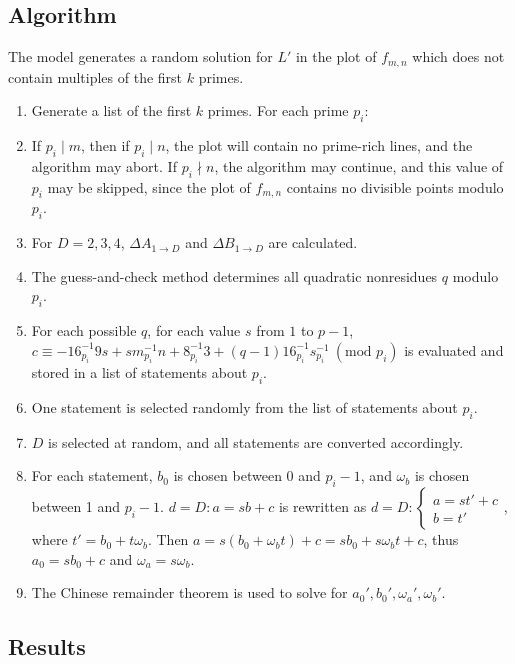 \documentclass{article}
\begin{document}
\subsection{Algorithm}

The model generates a random solution for \(L'\) in the plot of \(f_{m,n}\) which does not contain multiples of the first \(k\) primes.

\begin{enumerate}
	\item Generate a list of the first \(k\) primes. For each prime \(p_i\):
	\item If \(p_i \mid m\), then if \(p_i \mid n\), the plot will contain no prime-rich lines, and the algorithm may abort. If \(p_i \nmid n\), the algorithm may continue, and this value of \(p_i\) may be skipped, since the plot of \(f_{m,n}\) contains no divisible points modulo \(p_i\).
	\item For \(D = 2,3,4\), \(\Delta A_{1 \rightarrow D}\) and \(\Delta B_{1 \rightarrow D}\) are calculated.
	\item The guess-and-check method determines all quadratic nonresidues \(q\) modulo \(p_i\).
	\item For each possible \(q\), for each value \(s\) from \(1\) to \(p-1\), \(c \equiv -16^{-1}_{p_i}9s + sm^{-1}_{p_i}n + 8^{-1}_{p_i}3 + (q - 1)16^{-1}_{p_i}s^{-1}_{p_i}\ (\text{mod }p_i)\) is evaluated and stored in a list of statements about \(p_i\).
	\item One statement is selected randomly from the list of statements about \(p_i\).
	\item \(D\) is selected at random, and all statements are converted accordingly.
	\item For each statement, \(b_0\) is chosen between 0 and \(p_i-1\), and \(\omega_b\) is chosen between 1 and \(p_i-1\). \(d=D:a=sb+c\) is rewritten as \(d=D:\begin{cases}a=st'+c \\ b=t'\end{cases}\), where \(t' = b_0 + t\omega_b\). Then \(a = s(b_0 + \omega_bt)+c = sb_0 + s\omega_bt + c\), thus \(a_0 = sb_0 + c\) and \(\omega_a = s\omega_b\).
	\item The Chinese remainder theorem is used to solve for \(a_0',b_0',\omega_a',\omega_b'\).
\end{enumerate}


\subsection{Results}
\end{document}
